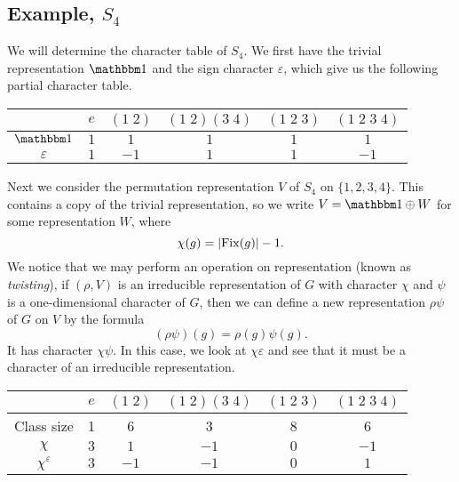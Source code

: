 \subsection{Example, $S_4$}

\begin{example}
    We will determine the character table of $S_4$. We first have the trivial representation $\mathbbm 1$ and the sign character $\varepsilon$, which give us the following partial character table.
    \begin{center}
        \begin{tabular}{cccccc}
            \toprule
                          & $e$ & $(1\;2)$ & $(1\;2)(3\;4)$ & $(1\;2\;3)$ & $(1\;2\;3\;4)$ \\
            \midrule
            $\mathbbm 1$  & $1$ & $1$      & $1$            & $1$         & $1$            \\
            $\varepsilon$ & $1$ & $-1$     & $1$            & $1$         & $-1$           \\
            \bottomrule
        \end{tabular}
    \end{center}
    Next we consider the permutation representation $V$ of $S_4$ on $\{1,2,3,4\}$. This contains a copy of the trivial representation, so we write $V = \mathbbm 1 \oplus W$ for some representation $W$, where
    \[ \chi(g) = \lvert \operatorname{Fix}(g) \rvert - 1. \]
    We notice that we may perform an operation on representation (known as \emph{twisting}), if $(\rho, V)$ is an irreducible representation of $G$ with character $\chi$ and $\psi$ is a one-dimensional character of $G$, then we can define a new representation $\rho\psi$ of $G$ on $V$ by the formula
    \[ (\rho\psi)(g) = \rho(g)\psi(g). \]
    It has character $\chi\psi$. In this case, we look at $\chi\varepsilon$ and see that it must be a character of an irreducible representation.
    \begin{center}
        \begin{tabular}{cccccc}
            \toprule
                               & $e$ & $(1\;2)$ & $(1\;2)(3\;4)$ & $(1\;2\;3)$ & $(1\;2\;3\;4)$ \\
            \midrule
            Class size         & 1   & 6        & 3              & 8           & 6              \\
            \midrule
            $\chi$             & $3$ & $1$      & $-1$           & $0$         & $-1$           \\
            $\chi^\varepsilon$ & $3$ & $-1$     & $-1$           & $0$         & $1$            \\

\end{tabular}
\end{center}
\end{example}
